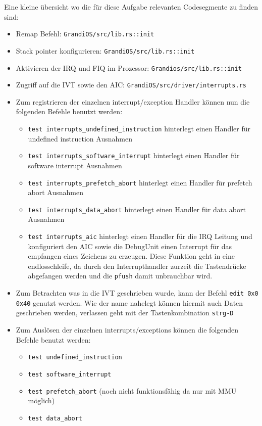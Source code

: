 \begin{description}
Eine kleine übersicht wo die für diese Aufgabe relevanten Codesegmente zu finden sind:
\begin{itemize}
	\item Remap Befehl: \texttt{GrandiOS/src/lib.rs::init}
	\item Stack pointer konfigurieren: \texttt{GrandiOS/src/lib.rs::init}
	\item Aktivieren der IRQ und FIQ im Prozessor: \texttt{Grandios/src/lib.rs::init}
	\item Zugriff auf die IVT sowie den AIC: \texttt{GrandiOS/src/driver/interrupts.rs}
	\item Zum registrieren der einzelnen interrupt/exception Handler können nun die folgenden Befehle benutzt werden:
	\begin{itemize}
		\item \texttt{test interrupts\_undefined\_instruction} hinterlegt einen Handler für undefined instruction Ausnahmen
		\item \texttt{test interrupts\_software\_interrupt} hinterlegt einen Handler für software interrupt Ausnahmen
		\item \texttt{test interrupts\_prefetch\_abort} hinterlegt einen Handler für prefetch abort Ausnahmen
		\item \texttt{test interrupts\_data\_abort} hinterlegt einen Handler für data abort Ausnahmen
		\item \texttt{test interrupts\_aic} hinterlegt einen Handler für die IRQ Leitung und konfiguriert den AIC sowie die DebugUnit einen Interrupt für das empfangen eines Zeichens zu erzeugen. Diese Funktion geht in eine endlosschleife, da durch den Interrupthandler zurzeit die Tastendrücke abgefangen werden und die \texttt{pfush} damit unbrauchbar wird.
	\end{itemize}
	\item Zum Betrachten was in die IVT geschrieben wurde, kann der Befehl \texttt{edit 0x0 0x40} genutzt werden. Wie der name nahelegt können hiermit auch Daten geschrieben werden, verlassen geht mit der Tastenkombination \texttt{strg-D}
	\item Zum Auslösen der einzelnen interrupts/exceptions können die folgenden Befehle benutzt werden:
	\begin{itemize}
		\item \texttt{test undefined\_instruction}
		\item \texttt{test software\_interrupt}
		\item \texttt{test prefetch\_abort} (noch nicht funktionsfähig da nur mit MMU möglich)
		\item \texttt{test data\_abort}
	\end{itemize}
\end{itemize}

\end{description}

